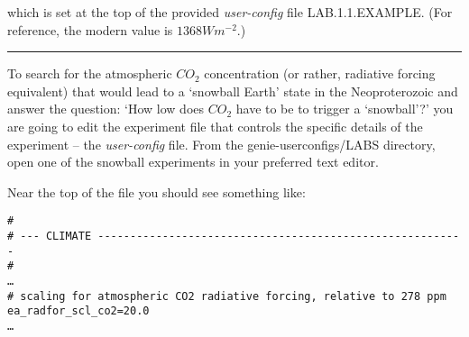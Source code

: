\noindent which is set at the top of the provided \textit{user-config} file \textsf{\footnotesize LAB.1.1.EXAMPLE}. (For reference, the modern value is \( 1368 Wm^{-2}\).)

\vspace{1mm}
\noindent\rule{4cm}{0.5pt}
\vspace{2mm}

\noindent To search for the atmospheric \(CO_{2}\) concentration (or rather, radiative forcing equivalent) that would lead to a ‘snowball Earth’ state in the Neoproterozoic and answer the question:
‘How low does \(CO_{2}\) have to be to trigger a ‘snowball’?’
you are going to edit the experiment file that controls the specific details of the experiment -- the \textit{user-config} file. From the \textsf{\footnotesize genie-userconfigs/LABS} directory, open one of the snowball experiments in your preferred  text editor. 

Near the top of the file you should see something like:

\vspace{-2mm}
\small\begin{verbatim}
#
# --- CLIMATE ---------------------------------------------------------
#
…
# scaling for atmospheric CO2 radiative forcing, relative to 278 ppm
ea_radfor_scl_co2=20.0
…
\end{verbatim}\normalsize
\vspace{-1mm}

